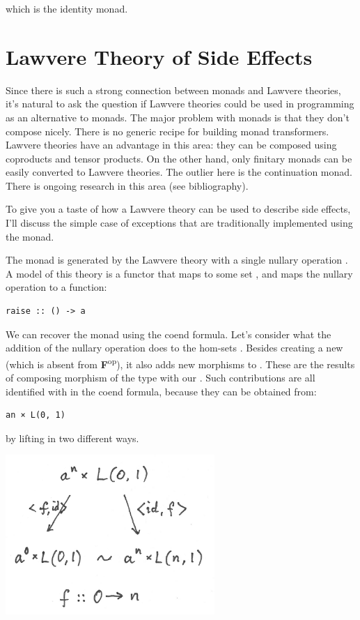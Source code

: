 which is the identity monad.

\section{Lawvere Theory of Side
Effects}\label{lawvere-theory-of-side-effects}

Since there is such a strong connection between monads and Lawvere
theories, it's natural to ask the question if Lawvere theories could be
used in programming as an alternative to monads. The major problem with
monads is that they don't compose nicely. There is no generic recipe for
building monad transformers. Lawvere theories have an advantage in this
area: they can be composed using coproducts and tensor products. On the
other hand, only finitary monads can be easily converted to Lawvere
theories. The outlier here is the continuation monad. There is ongoing
research in this area (see bibliography).

To give you a taste of how a Lawvere theory can be used to describe side
effects, I'll discuss the simple case of exceptions that are
traditionally implemented using the  monad.

The  monad is generated by the Lawvere theory with a
single nullary operation . A model of this
theory is a functor that maps  to some set , and
maps the nullary operation to a function:

\begin{Verbatim}[commandchars=\\\{\}]
raise :: () -> a
\end{Verbatim}

We can recover the  monad using the coend formula. Let's
consider what the addition of the nullary operation does to the hom-sets
. Besides creating a new  (which is
absent from \textbf{F}\textsuperscript{op}), it also adds new morphisms
to . These are the results of composing morphism of the
type  with our .
Such contributions are all identified with  in
the coend formula, because they can be obtained from:

\begin{Verbatim}[commandchars=\\\{\}]
an × L(0, 1)
\end{Verbatim}

by lifting  in two different ways.

\includegraphics[width=3.12500in]{images/equalize2.png}

